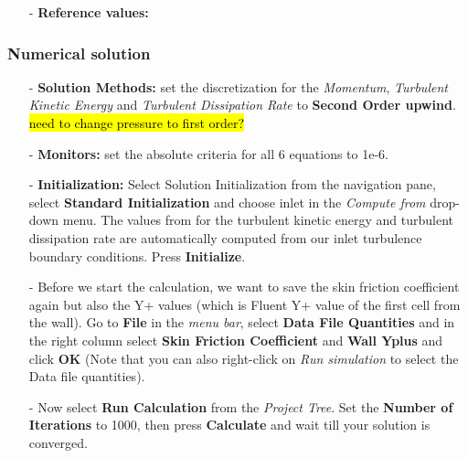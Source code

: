 \documentclass[11pt,a4paper,oneside]{scrartcl}
\newcommand\bfr[1]{\textcolor[rgb]{1,0.00,0.00}{\textbf{\textsf{#1}}}}
\begin{document}
\begin{itemize}
    \item[-] \textbf{Reference values: }
\end{itemize}

\subsubsection{Numerical solution}

\begin{itemize}
    \item[-] \textbf{Solution Methods:} set the discretization for the \emph{Momentum}, \emph{Turbulent Kinetic Energy} and \emph{Turbulent Dissipation Rate} to \bfr{Second Order upwind}. \hl{need to change pressure to first order?}
    \item[-] \textbf{Monitors:} set the absolute criteria for all 6 equations to 1e-6.
    \item[-] \textbf{Initialization:} Select Solution Initialization from the navigation pane, select \bfr{Standard Initialization} and choose inlet in the \emph{Compute from} drop-down menu. The values from for the turbulent kinetic energy and turbulent dissipation rate are automatically computed from our inlet turbulence boundary conditions. Press \bfr{Initialize}.
    \item[-] Before we start the calculation, we want to save the skin friction coefficient again but also the Y+ values (which is Fluent Y+ value of the first cell from the wall). Go to \bfr{File} in the \emph{menu bar}, select \bfr{Data File Quantities} and in the right column select \bfr{Skin Friction Coefficient} and \bfr{Wall Yplus} and click \bfr{OK} (Note that you can also right-click on \emph{Run simulation} to select the Data file quantities).
    \item[-] Now select \bfr{Run Calculation} from the \emph{Project Tree}. Set the \bfr{Number of Iterations} to 1000, then press \bfr{Calculate} and wait till your solution is converged.
\end{itemize}
\end{document}
